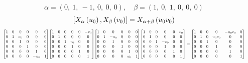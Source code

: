 \documentclass[11pt]{article}
\theoremstyle{definition}
\begin{document}
\[
\alpha = \left( 0, \  1, \  -1, \  0, \  0, \  0\right), \quad \beta = \left( 1, \  0, \  1, \  0, \  0, \  0\right)
\]
\[
\scaletoalign{\textwidth}{\left[ X_{\alpha}\left(u_{0}\right), X_{\beta}\left(v_{0}\right) \right] = X_{\alpha + \beta}\left(u_{0} v_{0}\right)}
\]
\[
\scaletoalign{\textwidth}{{\left[\begin{matrix}1 & 0 & 0 & 0 & 0 & 0\\0 & 1 & u_{0} & 0 & 0 & 0\\0 & 0 & 1 & 0 & 0 & 0\\0 & 0 & 0 & 1 & 0 & 0\\0 & 0 & 0 & 0 & 1 & 0\\0 & 0 & 0 & 0 & - u_{0} & 1\end{matrix}\right]} {\left[\begin{matrix}1 & 0 & 0 & 0 & 0 & - v_{0}\\0 & 1 & 0 & 0 & 0 & 0\\0 & 0 & 1 & v_{0} & 0 & 0\\0 & 0 & 0 & 1 & 0 & 0\\0 & 0 & 0 & 0 & 1 & 0\\0 & 0 & 0 & 0 & 0 & 1\end{matrix}\right]} {\left[\begin{matrix}1 & 0 & 0 & 0 & 0 & 0\\0 & 1 & - u_{0} & 0 & 0 & 0\\0 & 0 & 1 & 0 & 0 & 0\\0 & 0 & 0 & 1 & 0 & 0\\0 & 0 & 0 & 0 & 1 & 0\\0 & 0 & 0 & 0 & u_{0} & 1\end{matrix}\right]} {\left[\begin{matrix}1 & 0 & 0 & 0 & 0 & v_{0}\\0 & 1 & 0 & 0 & 0 & 0\\0 & 0 & 1 & - v_{0} & 0 & 0\\0 & 0 & 0 & 1 & 0 & 0\\0 & 0 & 0 & 0 & 1 & 0\\0 & 0 & 0 & 0 & 0 & 1\end{matrix}\right]} = {\left[\begin{matrix}1 & 0 & 0 & 0 & - u_{0} v_{0} & 0\\0 & 1 & 0 & u_{0} v_{0} & 0 & 0\\0 & 0 & 1 & 0 & 0 & 0\\0 & 0 & 0 & 1 & 0 & 0\\0 & 0 & 0 & 0 & 1 & 0\\0 & 0 & 0 & 0 & 0 & 1\end{matrix}\right]}}
\]
\end{document}
